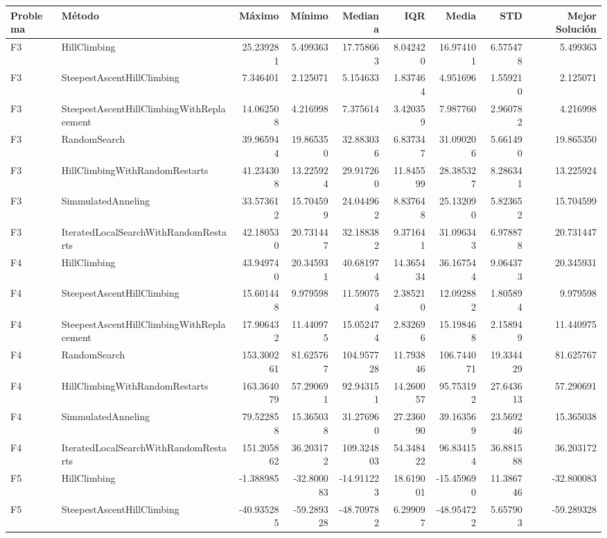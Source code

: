 \begin{tabular}{llrrrrrrr}
\toprule
Problema & Método & Máximo & Mínimo & Mediana & IQR & Media & STD & Mejor Solución \\
\midrule
F3 & HillClimbing & 25.239281 & 5.499363 & 17.758663 & 8.042420 & 16.974101 & 6.575478 & 5.499363 \\
F3 & SteepestAscentHillClimbing & 7.346401 & 2.125071 & 5.154633 & 1.837464 & 4.951696 & 1.559210 & 2.125071 \\
F3 & SteepestAscentHillClimbingWithReplacement & 14.062508 & 4.216998 & 7.375614 & 3.420359 & 7.987760 & 2.960782 & 4.216998 \\
F3 & RandomSearch & 39.965944 & 19.865350 & 32.883036 & 6.837347 & 31.090206 & 5.661490 & 19.865350 \\
F3 & HillClimbingWithRandomRestarts & 41.234308 & 13.225924 & 29.917260 & 11.845599 & 28.385327 & 8.286341 & 13.225924 \\
F3 & SimmulatedAnneling & 33.573612 & 15.704599 & 24.044962 & 8.837648 & 25.132090 & 5.823652 & 15.704599 \\
F3 & IteratedLocalSearchWithRandomRestarts & 42.180530 & 20.731447 & 32.188382 & 9.371641 & 31.096343 & 6.978878 & 20.731447 \\
F4 & HillClimbing & 43.949740 & 20.345931 & 40.681974 & 14.365434 & 36.167544 & 9.064373 & 20.345931 \\
F4 & SteepestAscentHillClimbing & 15.601448 & 9.979598 & 11.590754 & 2.385210 & 12.092882 & 1.805894 & 9.979598 \\
F4 & SteepestAscentHillClimbingWithReplacement & 17.906432 & 11.440975 & 15.052474 & 2.832696 & 15.198468 & 2.158949 & 11.440975 \\
F4 & RandomSearch & 153.300261 & 81.625767 & 104.957728 & 11.793846 & 106.744071 & 19.334429 & 81.625767 \\
F4 & HillClimbingWithRandomRestarts & 163.364079 & 57.290691 & 92.943151 & 14.260057 & 95.753192 & 27.643613 & 57.290691 \\
F4 & SimmulatedAnneling & 79.522858 & 15.365038 & 31.276960 & 27.236090 & 39.163569 & 23.569246 & 15.365038 \\
F4 & IteratedLocalSearchWithRandomRestarts & 151.205862 & 36.203172 & 109.324803 & 54.348422 & 96.834154 & 36.881588 & 36.203172 \\
F5 & HillClimbing & -1.388985 & -32.800083 & -14.911223 & 18.619001 & -15.459690 & 11.386746 & -32.800083 \\
F5 & SteepestAscentHillClimbing & -40.935285 & -59.289328 & -48.709782 & 6.299097 & -48.954722 & 5.657903 & -59.289328 \\

\end{tabular}
